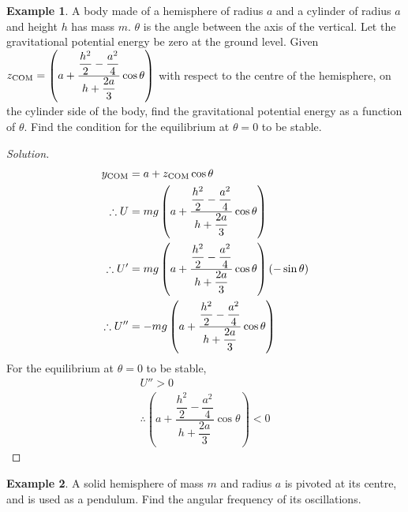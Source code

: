 \documentclass[fleqn, a4paper, 12pt]{amsart}
\theoremstyle{definition}
\newtheorem{example}{Example}
\theoremstyle{theorem}
\newenvironment{solution}
{\begin{proof}[Solution]\let\qed\relax}
	{\end{proof}}
\begin{document}
\begin{example}
	A body made of a hemisphere of radius $a$ and a cylinder of radius $a$ and height $h$ has mass $m$. $\theta$ is the angle between the axis of the vertical. Let the gravitational potential energy be zero at the ground level. Given $z_{\textnormal{COM}} = \left( a + \dfrac{\dfrac{h^2}{2} - \dfrac{a^2}{4}}{h + \dfrac{2a}{3}} \cos \theta \right)$ with respect to the centre of the hemisphere, on the cylinder side of the body, find the gravitational potential energy as a function of $\theta$. Find the condition for the equilibrium at $\theta = 0$ to be stable.
	\begin{figure}[H]
	\end{figure}
\end{example}

\begin{solution}
	\begin{align*}
		y_{\textnormal{COM}} &= a + z_{\textnormal{COM}} \cos \theta\\
		\therefore U &= m g \left( a + \dfrac{\dfrac{h^2}{2} - \dfrac{a^2}{4}}{h + \dfrac{2a}{3}} \cos \theta \right)\\
		\therefore U' &= m g \left( a + \dfrac{\dfrac{h^2}{2} - \dfrac{a^2}{4}}{h + \dfrac{2a}{3}} \cos \theta \right) (- \sin \theta)\\
		\therefore U'' &= - m g \left( a + \dfrac{\dfrac{h^2}{2} - \dfrac{a^2}{4}}{h + \dfrac{2a}{3}} \cos \theta \right)
	\end{align*}
	For the equilibrium at $\theta = 0$ to be stable,
	\begin{align*}
		U'' > 0\\
		\therefore \left( a + \dfrac{\dfrac{h^2}{2} - \dfrac{a^2}{4}}{h + \dfrac{2a}{3}} \cos \theta \right) < 0
	\end{align*}
\end{solution}

\begin{example}
	A solid hemisphere of mass $m$ and radius $a$ is pivoted at its centre, and is used as a pendulum. Find the angular frequency of its oscillations.
\end{example}
\end{document}
